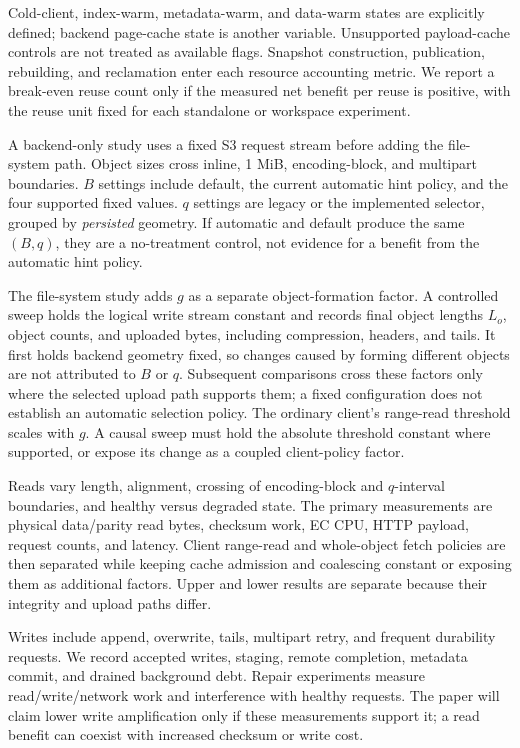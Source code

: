 Cold-client, index-warm, metadata-warm, and data-warm states are explicitly
defined; backend page-cache state is another variable. Unsupported
payload-cache controls are not treated as available flags. Snapshot
construction, publication, rebuilding, and reclamation enter each resource
accounting metric. We report a break-even reuse count only if the measured
net benefit per reuse is positive, with the reuse unit fixed for each
standalone or workspace experiment.

 A backend-only study uses a fixed S3 request stream before adding
the file-system path. Object sizes cross inline, 1 MiB, encoding-block, and
multipart boundaries. $B$ settings include default, the current automatic hint
policy, and the four supported fixed values. $q$ settings are legacy or the implemented
selector, grouped by \emph{persisted} geometry. If automatic and default
produce the same $(B,q)$, they are a no-treatment control, not evidence for a
benefit from the automatic hint policy.

The file-system study adds $g$ as a separate object-formation factor. A
controlled sweep holds the logical write stream constant and records final
object lengths $L_o$, object counts, and uploaded bytes, including compression,
headers, and tails. It first holds backend geometry fixed, so changes caused
by forming different objects are not attributed to $B$ or $q$. Subsequent
comparisons cross these factors only where the selected upload path supports
them; a fixed configuration does not establish an automatic selection policy.
The ordinary client's range-read threshold scales with $g$. A causal sweep
must hold the absolute threshold constant where supported, or expose its
change as a coupled client-policy factor.

Reads vary length, alignment, crossing of encoding-block and $q$-interval
boundaries, and healthy versus degraded state. The primary measurements are physical data/parity
read bytes, checksum work, EC CPU, HTTP payload, request counts, and latency.
Client range-read and whole-object fetch policies are then separated while keeping
cache admission and coalescing constant or exposing them as additional
factors. Upper and lower results are separate because their integrity
and upload paths differ.

Writes include append, overwrite, tails, multipart retry, and frequent
durability requests. We record accepted writes, staging, remote completion,
metadata commit, and drained background debt. Repair experiments measure
read/write/network work and interference with healthy requests. The paper
will claim lower write amplification only if these measurements support
it; a read benefit can coexist with increased checksum or write cost.

